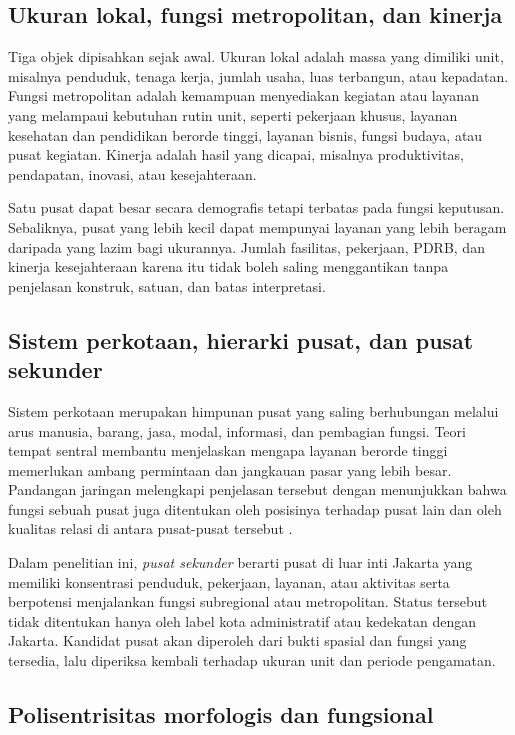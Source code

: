 \documentclass[11pt,a4paper,oneside,openany,indonesian]{report}
\begin{document}
\subsection{Ukuran lokal, fungsi metropolitan, dan kinerja}

Tiga objek dipisahkan sejak awal. Ukuran lokal adalah massa yang dimiliki unit, misalnya penduduk, tenaga kerja, jumlah usaha, luas terbangun, atau kepadatan. Fungsi metropolitan adalah kemampuan menyediakan kegiatan atau layanan yang melampaui kebutuhan rutin unit, seperti pekerjaan khusus, layanan kesehatan dan pendidikan berorde tinggi, layanan bisnis, fungsi budaya, atau pusat kegiatan. Kinerja adalah hasil yang dicapai, misalnya produktivitas, pendapatan, inovasi, atau kesejahteraan.

Satu pusat dapat besar secara demografis tetapi terbatas pada fungsi keputusan. Sebaliknya, pusat yang lebih kecil dapat mempunyai layanan yang lebih beragam daripada yang lazim bagi ukurannya. Jumlah fasilitas, pekerjaan, PDRB, dan kinerja kesejahteraan karena itu tidak boleh saling menggantikan tanpa penjelasan konstruk, satuan, dan batas interpretasi.

\subsection{Sistem perkotaan, hierarki pusat, dan pusat sekunder}

Sistem perkotaan merupakan himpunan pusat yang saling berhubungan melalui arus manusia, barang, jasa, modal, informasi, dan pembagian fungsi. Teori tempat sentral membantu menjelaskan mengapa layanan berorde tinggi memerlukan ambang permintaan dan jangkauan pasar yang lebih besar. Pandangan jaringan melengkapi penjelasan tersebut dengan menunjukkan bahwa fungsi sebuah pusat juga ditentukan oleh posisinya terhadap pusat lain dan oleh kualitas relasi di antara pusat-pusat tersebut \parencite{burgermeijers2016}.

Dalam penelitian ini, \textit{pusat sekunder} berarti pusat di luar inti Jakarta yang memiliki konsentrasi penduduk, pekerjaan, layanan, atau aktivitas serta berpotensi menjalankan fungsi subregional atau metropolitan. Status tersebut tidak ditentukan hanya oleh label kota administratif atau kedekatan dengan Jakarta. Kandidat pusat akan diperoleh dari bukti spasial dan fungsi yang tersedia, lalu diperiksa kembali terhadap ukuran unit dan periode pengamatan.

\subsection{Polisentrisitas morfologis dan fungsional}
\end{document}
